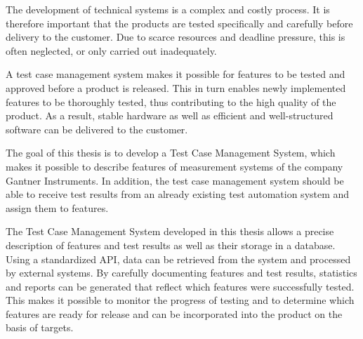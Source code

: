 \documentclass[a4paper, fontsize=11pt, parskip=half, twoside]{scrreprt}
\begin{document}
	The development of technical systems is a complex and costly process. 
	It is therefore important that the products are tested specifically and carefully before delivery to the customer. 
	Due to scarce resources and deadline pressure, this is often neglected, or only carried out inadequately. 
	
	A test case management system makes it possible for features to be tested and approved before a product is released. 
	This in turn enables newly implemented features to be thoroughly tested, thus contributing to the high quality of the product.
	As a result, stable hardware as well as efficient and well-structured software can be delivered to the customer.
	
	The goal of this thesis is to develop a Test Case Management System, which makes it possible to describe features of measurement systems of the company Gantner Instruments.
	In addition, the test case management system should be able to receive test results from an already existing test automation system and assign them to features.
	
	The Test Case Management System developed in this thesis allows a precise description of features and test results as well as their storage in a database. 
	Using a standardized API, data can be retrieved from the system and processed by external systems. 
	By carefully documenting features and test results, statistics and reports can be generated that reflect which features were successfully tested.
	This makes it possible to monitor the progress of testing and to determine which features are ready for release and can be incorporated into the product on the basis of targets.
	
	\cleardoublepage   %
	\setcounter{tocdepth}{2}
	\setcounter{secnumdepth}{4}
	\tableofcontents
	
	\clearpage
	\listoffigures
	
	\clearpage
	\listoflistings
	
	\clearpage
\end{document}
